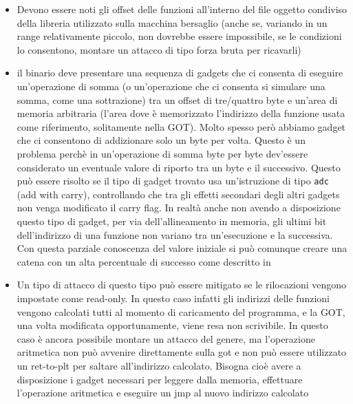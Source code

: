 \begin{itemize}

  \item Devono essere noti gli offset delle funzioni all'interno del
    file oggetto condiviso della libreria utilizzato sulla macchina
    bersaglio (anche se, variando in un range relativamente piccolo,
    non dovrebbe essere impossibile, se le condizioni lo consentono,
    montare un attacco di tipo forza bruta per ricavarli)

  \item il binario deve presentare una sequenza di gadgets che ci
    consenta di eseguire un'operazione di somma (o un'operazione che
    ci consenta si simulare una somma, come una sottrazione) tra un
    offset di tre/quattro byte e un'area di memoria arbitraria (l'area
    dove è memorizzato l'indirizzo della funzione usata come
    riferimento, solitamente nella GOT). Molto spesso però abbiamo
    gadget che ci consentono di addizionare solo un byte per
    volta. Questo è un problema perchè in un'operazione di somma byte
    per byte dev'essere considerato un eventuale valore di riporto tra
    un byte e il successivo. Questo può essere risolto se il tipo di
    gadget trovato usa un'istruzione di tipo \lstinline{adc} (add with
    carry), controllando che tra gli effetti secondari degli altri
    gadgets non venga modificato il carry flag. In realtà anche non
    avendo a disposizione questo tipo di gadget, per via
    dell'allineamento in memoria, gli ultimi bit dell'indirizzo di una
    funzione non variano tra un'esecuzione e la successiva. Con
    questa parziale conoscenza del valore iniziale si può comunque
    creare una catena con un alta percentuale di successo come
    descritto in \rif{}

  \item Un tipo di attacco di questo tipo può essere mitigato se le
    rilocazioni vengono impostate come read-only. In questo caso
    infatti gli indirizzi delle funzioni vengono calcolati tutti al
    momento di caricamento del programma, e la GOT, una volta
    modificata opportunamente, viene resa non scrivibile. In questo
    caso è ancora possibile montare un attacco del genere, ma
    l'operazione aritmetica non può avvenire direttamente sulla got e
    non può essere utilizzato un ret-to-plt per saltare all'indirizzo
    calcolato. Bisogna cioè avere a disposizione i gadget necessari
    per leggere dalla memoria, effettuare l'operazione aritmetica e
    eseguire un jmp al nuovo indirizzo calcolato

\end{itemize}

